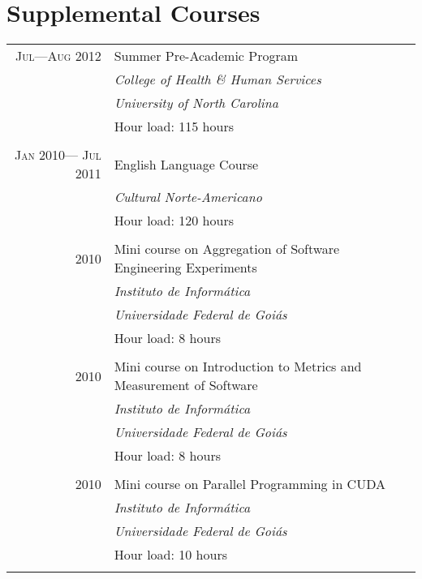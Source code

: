 \documentclass[a4paper,10pt]{article}
\begin{document}
\section{Supplemental Courses}
\begin{tabular}{r|p{11cm}}

  \textsc{Jul---Aug 2012} & Summer Pre-Academic Program\\ &
  \emph{College of Health \& Human Services}\\ &
  \emph{University of North Carolina}\\ &
  Hour load: 115 hours
  \\\multicolumn{2}{c}{} \\

  \textsc{Jan 2010--- Jul 2011} & English Language Course\\ &
  \emph{Cultural Norte-Americano} \\ &
  Hour load: 120 hours
  \\\multicolumn{2}{c}{} \\

  \textsc{2010} & Mini course on Aggregation of Software Engineering Experiments\\ &
  \emph{Instituto de Informática} \\ &
  \emph{Universidade Federal de Goiás}\\ &
  Hour load: 8 hours
  \\\multicolumn{2}{c}{} \\

  \textsc{2010} & Mini course on Introduction to Metrics and Measurement of Software\\ &
  \emph{Instituto de Informática} \\ &
  \emph{Universidade Federal de Goiás}\\ &
  Hour load: 8 hours
  \\\multicolumn{2}{c}{} \\

  \textsc{2010} & Mini course on Parallel Programming in CUDA\\ &
  \emph{Instituto de Informática} \\ &
  \emph{Universidade Federal de Goiás}\\ &
  Hour load: 10 hours
  \\\multicolumn{2}{c}{} \\

\end{tabular}

\pagebreak
\end{document}

